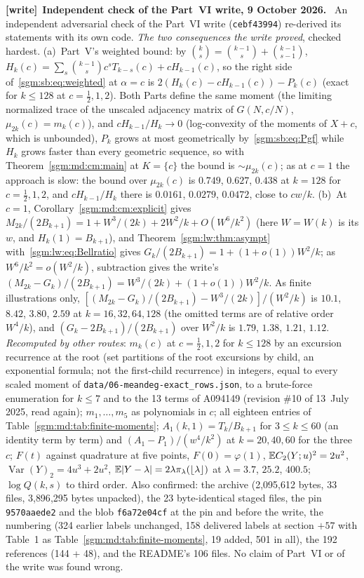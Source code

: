 \documentclass[11pt,letterpaper]{article}
\theoremstyle{remark}\newtheorem{remark}[theorem]{Remark}
\newcommand{\file}[1]{\nolinkurl{#1}}
\newenvironment{writenote}[1][]{\par\smallskip\begingroup\small
 \noindent\textbf{[write]}\if\relax\detokenize{#1}\relax\else~\textbf{#1.}\fi\ }%
 {\par\endgroup\smallskip}
\theoremstyle{definition}\newtheorem{definition}[theorem]{Definition}
\begin{document}
\begin{writenote}[Independent check of the Part~VI write, 9 October 2026]
An independent adversarial check of the Part~VI write (\file{cebf43994}) re-derived its
statements with its own code. \emph{The two consequences the write proved}, checked hardest.
(a)~Part~V's weighted bound: by $\binom ks=\binom{k-1}s+\binom{k-1}{s-1}$,
$H_k(c)=\sum_s\binom{k-1}sc^sT_{k-s}(c)+cH_{k-1}(c)$, so the right side
of~\eqref{sgm:sb:eq:weighted} at $\alpha=c$ is $2(H_k(c)-cH_{k-1}(c))-P_k(c)$
(exact for $k\le128$ at $c=\frac12,1,2$). Both Parts define the same moment
(the limiting normalized trace of the unscaled adjacency matrix of $G(N,c/N)$,
$\mu_{2k}(c)=m_k(c)$), and $cH_{k-1}/H_k\to0$ (log-convexity of the moments of $X+c$,
which is unbounded), $P_k$ grows at most geometrically by~\eqref{sgm:sb:eq:Pgf}
while $H_k$ grows faster than every geometric sequence, so with
Theorem~\ref{sgm:md:cm:main} at $K=\{c\}$ the bound is $\sim\mu_{2k}(c)$; as at $c=1$ the
approach is slow: the bound over $\mu_{2k}(c)$ is $0.749$, $0.627$, $0.438$ at $k=128$
for $c=\frac12,1,2$, and $cH_{k-1}/H_k$ there is $0.0161$, $0.0279$, $0.0472$, close to
$cw/k$. (b)~At $c=1$, Corollary~\ref{sgm:md:cm:explicit} gives
$M_{2k}/(2B_{k+1})=1+W^3/(2k)+2W^2/k+O(W^6/k^2)$ (here $W=W(k)$ is its $w$, and $H_k(1)=B_{k+1}$), and
Theorem~\ref{sgm:lw:thm:asympt} with~\eqref{sgm:lw:eq:Bellratio} gives
$G_k/(2B_{k+1})=1+(1+o(1))W^2/k$; as $W^6/k^2=o(W^2/k)$, subtraction gives the
write's $(M_{2k}-G_k)/(2B_{k+1})=W^3/(2k)+(1+o(1))W^2/k$. As finite illustrations only,
$[(M_{2k}-G_k)/(2B_{k+1})-W^3/(2k)]/(W^2/k)$ is $10.1$, $8.42$, $3.80$, $2.59$ at
$k=16,32,64,128$ (the omitted terms are of relative order $W^4/k$), and
$(G_k-2B_{k+1})/(2B_{k+1})$ over $W^2/k$ is $1.79$, $1.38$, $1.21$, $1.12$.
\emph{Recomputed by other routes}: $m_k(c)$ at $c=\frac12,1,2$ for $k\le128$ by an
excursion recurrence at the root (set partitions of the root excursions by child, an
exponential formula; not the first-child recurrence) in integers, equal to every scaled
moment of \file{data/06-meandeg-exact_rows.json}, to a brute-force enumeration for
$k\le7$ and to the 13 terms of A094149 (revision \#10 of 13~July 2025, read again);
$m_1,\dots,m_5$ as polynomials in $c$; all eighteen entries of
Table~\ref{sgm:md:tab:finite-moments}; $A_1(k,1)=T_k/B_{k+1}$ for $3\le k\le60$ (an
identity term by term) and $(A_1-P_1)/(w^4/k^2)$ at $k=20,40,60$ for the three $c$;
$F(t)$ against quadrature at five points, $F(0)=\varphi(1)$, $\mathbb E C_2(Y;u)^2=2u^2$,
$\operatorname{Var}(Y)_2=4u^3+2u^2$, $\mathbb E|Y-\lambda|=2\lambda\pi_\lambda(\lfloor\lambda\rfloor)$
at $\lambda=3.7$, $25.2$, $400.5$; $\log Q(k,s)$ to third order. Also confirmed: the
archive (2{,}095{,}612 bytes, 33 files, 3{,}896{,}295 bytes unpacked), the 23
byte-identical staged files, the pin \file{9570aaede2} and the blob \file{f6a72e04cf}
at the pin and before the write, the numbering (324 earlier labels unchanged, 158
delivered labels at section $+57$ with Table~1 as Table~\ref{sgm:md:tab:finite-moments},
19 added, 501 in all), the 192 references (144 + 48), and the README's 106 files.
No claim of Part~VI or of the write was found wrong.
\end{writenote}
\end{document}
